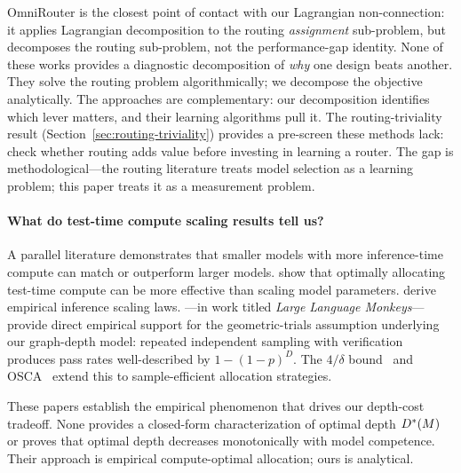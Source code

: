 OmniRouter is the closest point of contact with our Lagrangian non-connection: it applies Lagrangian decomposition to the routing \emph{assignment} sub-problem, but decomposes the routing sub-problem, not the performance-gap identity.
None of these works provides a diagnostic decomposition of \emph{why} one design beats another.
They solve the routing problem algorithmically; we decompose the objective analytically.
The approaches are complementary: our decomposition identifies which lever matters, and their learning algorithms pull it.
The routing-triviality result (Section~\ref{sec:routing-triviality}) provides a pre-screen these methods lack: check whether routing adds value before investing in learning a router.
The gap is methodological---the routing literature treats model selection as a learning problem; this paper treats it as a measurement problem.

\paragraph{What do test-time compute scaling results tell us?}
A parallel literature demonstrates that smaller models with more inference-time compute can match or outperform larger models.
\citet{snell2025testtime} show that optimally allocating test-time compute can be more effective than scaling model parameters.
\citet{wu2025inference} derive empirical inference scaling laws.
\citet{brown2024monkeys}---in work titled \emph{Large Language Monkeys}---provide direct empirical support for the geometric-trials assumption underlying our graph-depth model: repeated independent sampling with verification produces pass rates well-described by $1-(1-p)^D$.
The $4/\delta$ bound~\citep{fourdelta2024} and OSCA~\citep{osca2024} extend this to sample-efficient allocation strategies.

These papers establish the empirical phenomenon that drives our depth-cost tradeoff.
None provides a closed-form characterization of optimal depth $D^*(M)$ or proves that optimal depth decreases monotonically with model competence.
Their approach is empirical compute-optimal allocation; ours is analytical.

